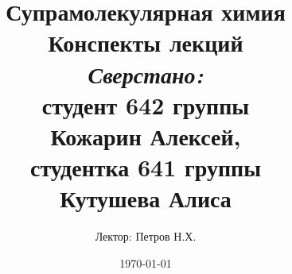
\author{Лектор: Петров Н.Х.}



\title{
	\textbf{Супрамолекулярная химия} \\
	\vspace{1in}
	{Конспекты лекций} \\
	\vspace{2.5in}
	\raggedleft \large \emph{Сверстано:}\\ 
		студент 642 группы\\ 
		Кожарин Алексей, \\
		студентка 641 группы \\
		Кутушева Алиса
}

\date{\today} %

